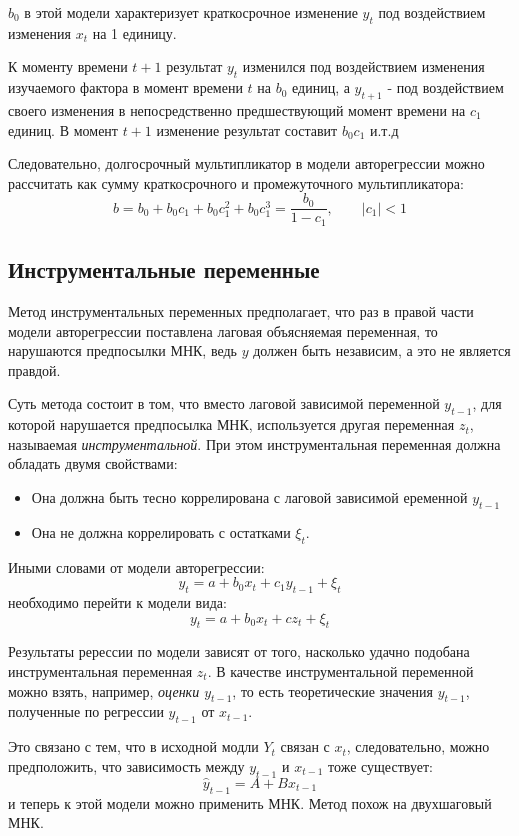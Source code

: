 \documentclass[aps,%
12pt,%
final,%
oneside,
onecolumn,%
musixtex, %
superscriptaddress,%
centertags]{article} %
\theoremstyle{plain}
\theoremstyle{definition}
\theoremstyle{remark}
\begin{document}
$b_0$ в этой модели характеризует краткосрочное изменение $y_t$ под воздействием изменения $x_t$ на 1 единицу.

К моменту времени $t+1$ результат $y_t$ изменился под воздействием изменения изучаемого фактора в момент времени $t$ на $b_0$ единиц, а $y_{t+1}$ - под воздействием своего изменения в непосредственно предшествующий момент времени на $c_1$ единиц. В момент $t+1$ изменение результат составит $b_0c_1$ и.т.д

Следовательно, долгосрочный мультипликатор в модели авторегрессии можно рассчитать как сумму краткосрочного и промежуточного мультипликатора:
$$b = b_0 + b_0c_1 + b_0c_1^2 + b_0c_1^3 = \frac{b_0}{1-c_1}, \qquad |c_1| <1$$

\newpage
\subsection{Инструментальные переменные}

Метод инструментальных переменных предполагает, что раз в правой части модели авторегрессии поставлена лаговая объясняемая переменная, то нарушаются предпосылки МНК, ведь $y$ должен быть независим, а это не является правдой.

Суть метода состоит в том, что вместо лаговой зависимой переменной $y_{t-1}$, для которой нарушается предпосылка МНК, используется другая переменная $z_t$, называемая \textit{инструментальной}. При этом инструментальная переменная должна обладать двумя свойствами:

\begin{itemize}
	\item Она должна быть тесно коррелирована с лаговой зависимой еременной $y_{t-1}$
	\item Она не должна коррелировать с остатками $\xi_t$. 
\end{itemize} 

Иными словами от модели авторегрессии:
$$y_t = a + b_0x_t + c_1y_{t-1} + \xi_t$$
необходимо перейти к модели вида:
$$y_t = a + b_0x_t + cz_t + \xi_t$$

Результаты ререссии по модели зависят от того, насколько удачно подобана инструментальная переменная $z_t$. В качестве инструментальной переменной можно взять, например, \textit{оценки $y_{t-1}$}, то есть теоретические значения $y_{t-1}$, полученные по регрессии $y_{t-1}$ от $x_{t-1}$. 

Это связано с тем, что в исходной модли $Y_t$ связан с $x_t$, следовательно, можно предположить, что зависимость между $y_{t-1}$ и $x_{t-1}$ тоже существует:
$$\hat{y}_{t-1} = A + B x_{t-1}$$ 
и теперь к этой модели можно применить МНК. Метод похож на двухшаговый МНК.
\end{document}
